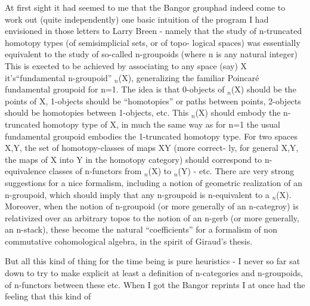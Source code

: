 At first sight it had seemed to me that the Bangor group\hand{/}had indeed
come to work out (quite independently) one basic intuition of the program
I had envisioned in those letters to Larry Breen  -  namely that the
study of n-truncated homotopy types (of semisimplicial sets,  or of topo-%
logical spaces) was essentially equivalent to the study of so-called
n-groupoids (where n is any natural integer) This is exected to be
achieved by associating to any space (say) X it's\hand{|}``fundamental n-groupoid''
\hand{$\Pi$}$_n$(X),  generalizing the familiar Poincar\'e fundamental groupoid for n=1.
The  idea is that 0-objects of \hand{$\Pi$}$_n$(X) should be the points of X,
1-objects should be ``homotopies'' or paths between points,  2-objects
should be homotopies between 1-objects, etc.  This \hand{$\Pi$}$_n$(X)  should embody
the n-truncated homotopy type of X, in much the same way as for n=1 the
usual fundamental groupoid embodies the 1-truncated homotopy type.  For
two spaces X,Y,  the set of homotopy-classes of maps X\hand{$\to$}Y (more correct-%
ly, for general X,Y,  the maps of X into Y in the homotopy category)
should correspond to n-equivalence classes of n-functors from \hand{$\Pi$}$_n$(X) to
\hand{$\Pi$}$_n$(Y)  -  etc.  There are very stro\hand{$\frown$}ng  suggestions for a nice formalism,
including a notion of geometric realization of an n-groupoid,  which
should imply that any n-groupoid is n-equivalent to a \hand{$\Pi$}$_n$(X).  Moreover,
when the notion of n-groupoid (or more generally of an n-categroy) is
relativized over an arbitrary topos to the notion of an n-gerb (or more
generally, an n-stack), these become the  natural ``coefficients'' for
a formalism of non commutative cohomological algebra,  in the spirit of
Giraud's thesis.

But all this kind of thing for the time being is pure heuristics
-  I never so far sat down to try to make explicit at least a definition
of n-categories and n-groupoids,  of n-functors between these etc.  When
I got the Bangor reprints I at once had the feeling that this kind of 

